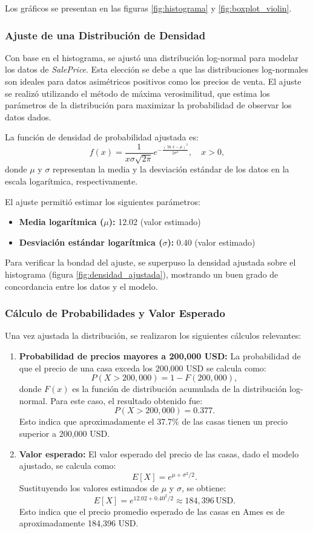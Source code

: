 \documentclass[12pt]{article}
\begin{document}
Los gráficos se presentan en las figuras \ref{fig:histograma} y \ref{fig:boxplot_violin}.

\subsubsection{Ajuste de una Distribución de Densidad}
Con base en el histograma, se ajustó una distribución log-normal para modelar los datos de \textit{SalePrice}. Esta elección se debe a que las distribuciones log-normales son ideales para datos asimétricos positivos como los precios de venta. El ajuste se realizó utilizando el método de máxima verosimilitud, que estima los parámetros de la distribución para maximizar la probabilidad de observar los datos dados.

La función de densidad de probabilidad ajustada es:
\[
f(x) = \frac{1}{x \sigma \sqrt{2\pi}} e^{-\frac{(\ln x - \mu)^2}{2\sigma^2}}, \quad x > 0,
\]
donde $\mu$ y $\sigma$ representan la media y la desviación estándar de los datos en la escala logarítmica, respectivamente.

El ajuste permitió estimar los siguientes parámetros:
\begin{itemize}
    \item \textbf{Media logarítmica ($\mu$):} 12.02 (valor estimado)
    \item \textbf{Desviación estándar logarítmica ($\sigma$):} 0.40 (valor estimado)
\end{itemize}

Para verificar la bondad del ajuste, se superpuso la densidad ajustada sobre el histograma (figura \ref{fig:densidad_ajustada}), mostrando un buen grado de concordancia entre los datos y el modelo.

\subsubsection{Cálculo de Probabilidades y Valor Esperado}
Una vez ajustada la distribución, se realizaron los siguientes cálculos relevantes:

\begin{enumerate}
    \item \textbf{Probabilidad de precios mayores a 200,000 USD:}
    La probabilidad de que el precio de una casa exceda los 200,000 USD se calcula como:
    \[
    P(X > 200,000) = 1 - F(200,000),
    \]
    donde $F(x)$ es la función de distribución acumulada de la distribución log-normal. Para este caso, el resultado obtenido fue:
    \[
    P(X > 200,000) = 0.377.
    \]
    Esto indica que aproximadamente el 37.7\% de las casas tienen un precio superior a 200,000 USD.

    \item \textbf{Valor esperado:}
    El valor esperado del precio de las casas, dado el modelo ajustado, se calcula como:
    \[
    E[X] = e^{\mu + \sigma^2 / 2}.
    \]
    Sustituyendo los valores estimados de $\mu$ y $\sigma$, se obtiene:
    \[
    E[X] = e^{12.02 + 0.40^2 / 2} \approx 184,396 \, \text{USD}.
    \]
    Esto indica que el precio promedio esperado de las casas en Ames es de aproximadamente 184,396 USD.
\end{enumerate}
\end{document}
